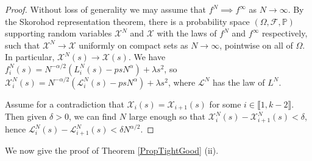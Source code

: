 \begin{proof}
	Without loss of generality we may assume that $f^N \implies f^\infty$ as $N\to\infty$. By the Skorohod representation theorem, there is a probability space $(\Omega,\mathcal{F},\mathbb{P})$ supporting random variables $\mathcal{X}^N$ and $\mathcal{X}$ with the laws of $f^N$ and $f^\infty$ respectively, such that $\mathcal{X}^N \to \mathcal{X}$ uniformly on compact sets as $N\to\infty$, pointwise on all of $\Omega$. In particular, $\mathcal{X}^N(s) \to \mathcal{X}(s)$. We have $f^N_i(s) = N^{-\alpha/2}(L^N_i(s) - psN^\alpha) + \lambda s^2$, so $\mathcal{X}^N_i(s) = N^{-\alpha/2}(\mathcal{L}^N_i(s) - psN^\alpha) + \lambda s^2$, where $\mathcal{L}^N$ has the law of $L^N$.
	
	Assume for a contradiction that $\mathcal{X}_i(s) = \mathcal{X}_{i+1}(s)$ for some $i\in\llbracket 1,k-2\rrbracket$. Then given $\delta>0$, we can find $N$ large enough so that $\mathcal{X}_i^N(s) - \mathcal{X}^N_{i+1}(s) < \delta$, hence $\mathcal{L}_i^N(s) - \mathcal{L}^N_{i+1}(s) < \delta N^{\alpha/2}$. 
\end{proof}

We now give the proof of Theorem \ref{PropTightGood} (ii).

